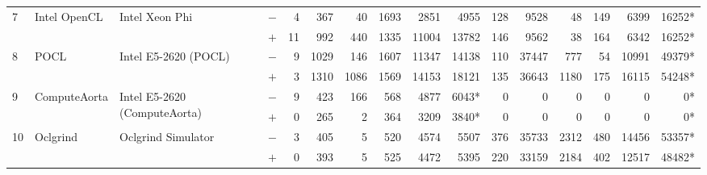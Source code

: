 \begin{tabular}{llll | rrrrrr | rrrrrr }
\hline
\multirow{ 2}{*}{7} & \multirow{ 2}{*}{Intel OpenCL} & \multirow{ 2}{*}{Intel Xeon Phi} & $-$ & 4 & 367 & 40 & 1693 & 2851 & 4955       & 128 & 9528 & 48 & 149 & 6399 & 16252* \\& & & $+$ & 11 & 992 & 440 & 1335 & 11004 & 13782 & 146 & 9562 & 38 & 164 & 6342 & 16252* \\
\hline
\multirow{ 2}{*}{8} & \multirow{ 2}{*}{POCL} & \multirow{ 2}{*}{Intel E5-2620 (POCL)} & $-$ & 9 & 1029 & 146 & 1607 & 11347 & 14138       & 110 & 37447 & 777 & 54 & 10991 & 49379* \\& & & $+$ & 3 & 1310 & 1086 & 1569 & 14153 & 18121 & 135 & 36643 & 1180 & 175 & 16115 & 54248* \\
\hline
\multirow{ 2}{*}{9} & \multirow{ 2}{*}{ComputeAorta} & \multirow{ 2}{*}{Intel E5-2620 (ComputeAorta)} & $-$ & 9 & 423 & 166 & 568 & 4877 & 6043*       & 0 & 0 & 0 & 0 & 0 & 0* \\& & & $+$ & 0 & 265 & 2 & 364 & 3209 & 3840* & 0 & 0 & 0 & 0 & 0 & 0* \\
\hline
\multirow{ 2}{*}{10} & \multirow{ 2}{*}{Oclgrind} & \multirow{ 2}{*}{Oclgrind Simulator} & $-$ & 3 & 405 & 5 & 520 & 4574 & 5507       & 376 & 35733 & 2312 & 480 & 14456 & 53357* \\& & & $+$ & 0 & 393 & 5 & 525 & 4472 & 5395 & 220 & 33159 & 2184 & 402 & 12517 & 48482* \\
  \bottomrule
\end{tabular}

